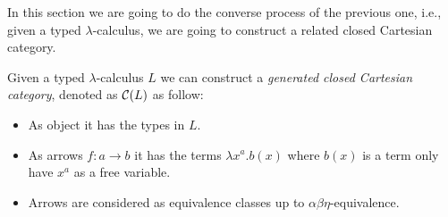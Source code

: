 In this section we are going to do the converse process of the previous one, i.e., given a typed $\lambda$-calculus, we are going to construct a related closed Cartesian category.

\begin{definition}
  Given a typed $\lambda$-calculus $L$ we can construct a \emph{generated closed Cartesian category}, denoted as $\mathcal{C} (L)$ as follow:
  \begin{itemize}
  \item As object it has the types in $L$.
  \item As arrows $f:a\to b$ it has the terms $\lambda x^a. b(x)$ where $b(x)$ is a term only have $x^a$ as a free variable.
  \item Arrows are considered as equivalence classes up to $\alpha\beta\eta$-equivalence.
  \end{itemize}
\end{definition}

